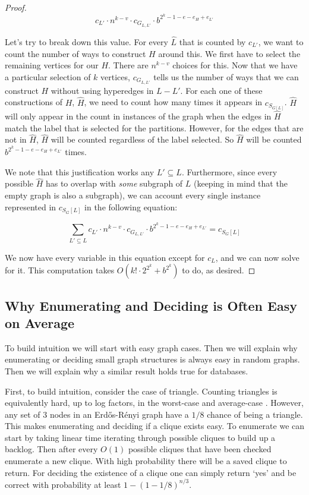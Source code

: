 \documentclass[11pt,letterpaper,pdftex]{article}
\begin{document}
\begin{proof}
\[
c_{L'} \cdot n^{k-v} \cdot c_{G_{L,L'}} \cdot b^{2^k - 1 - e - e_H + e_{L'}} 
\]

Let's try to break down this value. For every $\hat{L}$ that is counted by $c_{L'}$, we want to count the number of ways to construct $H$ around this. We first have to select the remaining vertices for our $H$. There are $n^{k-v}$ choices for this. Now that we have a particular selection of $k$ vertices, $c_{G_{L,L'}}$ tells us the number of ways that we can construct $H$ without using hyperedges in $L-L'$. For each one of these constructions of $H$, $\hat H $, we need to count how many times it appears in $c_{S_{G[L]}}$. $\hat H $ will only appear in the count in instances of the graph when the edges in $\hat H $ match the label that is selected for the partitions. However, for the edges that are not in $\hat H $, $\hat H $ will be counted regardless of the label selected. So $\hat H $ will be counted $ b^{ 2 ^ k -1 - e - e_H + e_{L'}}  $ times.

We note that this justification works any $L'\subseteq L$. Furthermore, since every possible $\hat H $ has to overlap with \textit{some} subgraph of $ L $ (keeping in mind that the empty graph is also a subgraph), we can account every single instance represented in $c_ { S_G [L] } $ in the following equation:

\[
\sum_{L'\subseteq L }  c_{L'} \cdot n^{k-v} \cdot c_{G_{L,L'}} \cdot b^{2^k-1 - e - e_H + e_{L'}}  = c_{S_G[L]}
\]

We now have every variable in this equation except for $c_L$, and we can now solve for it. This computation takes $O(k!\cdot 2^{2^k } + b^{2^k })$ to do, as desired.
\end{proof}

\subsection{Why Enumerating and Deciding  is Often Easy on Average}
\label{subsec:whyEnumIsEasy}
To build intuition we will start with easy graph cases. Then we will explain why enumerating or deciding small graph structures is always easy in random graphs. Then we will explain why a similar result holds true for databases. 

First, to build intuition, consider the case of triangle. Counting triangles is equivalently hard, up to log factors, in the worst-case and average-case \cite{UniformCliqueABB}. However, any set of $3$ nodes in an Erd{\H{o}}s-R{\'{e}}nyi graph have a $1/8$ chance of being a triangle. This makes enumerating and deciding if a clique exists easy. To enumerate we can start by taking linear time iterating through possible cliques to build up a backlog. Then after every $O(1)$ possible cliques that have been checked enumerate a new clique. With high probability there will be a saved clique to return. For deciding the existence of a clique one can simply return `yes' and be correct with probability at least $1 - (1-1/8)^{n/3}$. 
\end{document}
